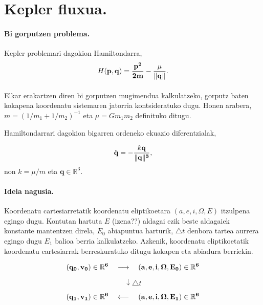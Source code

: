 \section{Kepler fluxua.}

\paragraph*{\textbf{Bi gorputzen problema}.} Kepler problemari dagokion Hamiltondarra,
\begin{equation}
H(\bf{p},\bf{q})=\frac{\mathbf{p}^2}{2m}-\frac{\mu}{\|\mathbf{q}\|}.
\end{equation}

\paragraph*{} Elkar erakartzen diren bi gorputzen mugimendua kalkulatzeko, gorputz baten kokapena koordenatu sistemaren jatorria kontsideratuko dugu. Honen arabera, $m=(1/m_1+1/m_2)^{-1}$ eta $\mu=Gm_1m_2$ definituko ditugu. 

Hamiltondarrari dagokion bigarren ordeneko ekuazio diferentzialak,

\begin{equation}
\ddot{\mathbf{q}}= - \frac{k\mathbf{q}}{\|\bf{q}\|^3} ,
\end{equation}
non $k= \mu / m$ eta  $\mathbf{q}\in \mathbb{R}^3$.


\paragraph*{\textbf{Ideia nagusia}.} Koordenatu cartesiarretatik koordenatu eliptikoetara $(a,e,i,\Omega,E)$ itzulpena egingo dugu. Kontutan hartuta $E$ (izena??) aldagai ezik beste aldagaiek konstante mantentzen direla, $E_0$ abiapuntua harturik, $\triangle t$ denbora tartea aurrera egingo dugu $E_1$ balioa berria kalkulatzeko. Azkenik, koordenatu eliptikoetatik koordenatu cartesiarrak berreskuratuko ditugu kokapen eta abiadura berriekin. 

\begin{equation*}
(\bf{q_0},\bf{v_0}) \in \mathbb{R}^6 \ \ \ \longrightarrow \ \ \  (a,e,i,\Omega,E_0) \in \mathbb{R}^6 
\end{equation*}

\begin{equation*}
\downarrow \triangle t
\end{equation*}

\begin{equation*}
(\bf{q_1},\bf{v_1}) \in \mathbb{R}^6 \ \ \ \longleftarrow \ \ \  (a,e,i,\Omega,E_1) \in \mathbb{R}^6 
\end{equation*}

